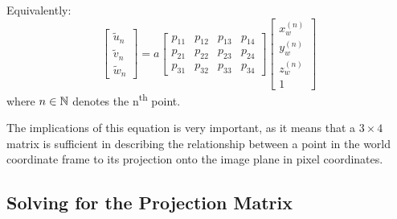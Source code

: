 Equivalently:
\begin{equation} \label{eq:proj}
    \begin{bmatrix}
        \widetilde{u}_n \\ \widetilde{v}_n \\ \widetilde{w}_n
    \end{bmatrix}
    =
    a
    \begin{bmatrix}
        p_{11} & p_{12} & p_{13} & p_{14} \\
        p_{21} & p_{22} & p_{23} & p_{24} \\
        p_{31} & p_{32} & p_{33} & p_{34}
    \end{bmatrix}
    \begin{bmatrix}
        x_w^{(n)} \\ y_w^{(n)} \\ z_w^{(n)} \\ 1
    \end{bmatrix}
\end{equation}
where $n \in \mathbb{N}$ denotes the n\textsuperscript{th} point.

The implications of this equation is very important, as it means that a $3 \times 4$ matrix is sufficient in describing the relationship between a point in the world coordinate frame to its projection onto the image plane in pixel coordinates.

\subsection{Solving for the Projection Matrix}

